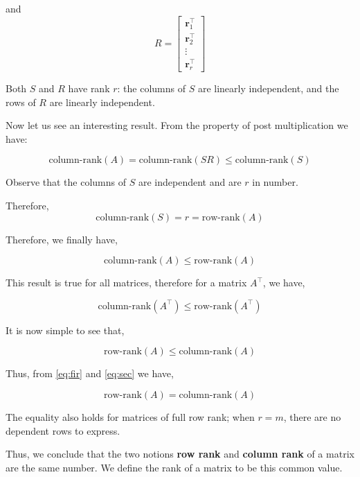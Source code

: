 \documentclass[a4paper]{article}
\begin{document}
and 
\begin{equation}
R = \begin{bmatrix}
\boldsymbol{r}_1^{\top} \\
\boldsymbol{r}_2^{\top} \\
\vdots \\
\boldsymbol{r}_r^{\top}
\end{bmatrix}
\end{equation}

Both $S$ and $R$ have rank $r$: the columns of $S$ are linearly independent, and the rows of $R$ are linearly independent.

Now let us see an interesting result. From the property of post multiplication we have:

\begin{equation}
\text{column-rank}(A) = \text{column-rank}(SR) \leq \text{column-rank}(S)
\end{equation}

Observe that the columns of $S$ are independent and are $r$ in number. 

Therefore,
\begin{equation}
\text{column-rank}(S) = r = \text{row-rank}(A)
\end{equation}

Therefore, we finally have,

\begin{equation}
\text{column-rank}(A) \leq \text{row-rank}(A)
\label{eq:fir}
\end{equation}

This result is true for all matrices, therefore for a matrix $A^{\top}$, we have,

\begin{equation}
\text{column-rank}(A^{\top}) \leq \text{row-rank}(A^{\top})
\end{equation}

It is now simple to see that,

\begin{equation}
\text{row-rank}(A) \leq \text{column-rank}(A)
\label{eq:sec}
\end{equation}

Thus, from \ref{eq:fir} and \ref{eq:sec} we have,

\begin{equation}
\text{row-rank}(A) = \text{column-rank}(A)
\end{equation}

The equality also holds for matrices of full row rank; when $r=m$, there are no dependent rows to express.

Thus, we conclude that the two notions \textbf{row rank} and \textbf{column rank} of a matrix are the same number. We define the rank of a matrix to be this common value.
\end{document}
